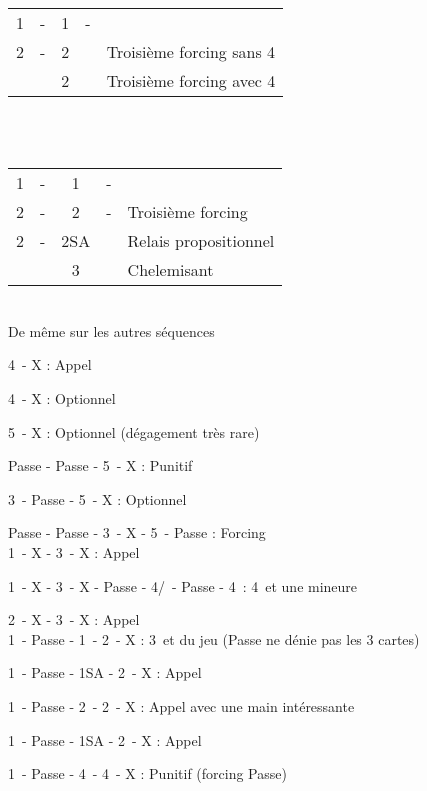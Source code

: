 \documentclass[a4paper, oneside, 11pt]{report}
\begin{document}
	\begin{tabular}{cccc|l}
	1\trefle & - & 1\pique & - &\\
	2\trefle & - & 2\carreau && Troisième forcing sans 4\coeur\\
	&& 2\coeur && Troisième forcing avec 4\coeur\\
	\end{tabular}\\\\
		
	\begin{tabular}{cccc|l}
	1\trefle & - & 1\coeur & - &\\
	2\trefle & - & 2\carreau & - & Troisième forcing\\
	2\coeur & - & 2SA && Relais propositionnel\\
	&& 3\coeur &&Chelemisant\\
	\end{tabular}\\
	De même sur les autres séquences
	
		4\coeur\ - X : Appel
		
		4\pique\ - X : Optionnel
		
		5\trefle\ - X : Optionnel (dégagement très rare)
		
		Passe - Passe - 5\trefle\ - X : Punitif
		
		3\trefle\ - Passe - 5\trefle\ - X : Optionnel
		
		Passe - Passe - 3\trefle\ - X - 5\trefle\ - Passe : Forcing\\
		
		1\pique\ - X - 3\pique\ - X : Appel
		
		1\pique\ - X - 3\pique\ - X - Passe - 4\trefle/\carreau\ - Passe - 4\coeur\ : 4\coeur\ et une mineure
		
		2\pique\ - X - 3\pique\ - X : Appel\\
		
		1\carreau\ - Passe - 1\coeur\ - 2\trefle\ - X : 3\coeur\ et du jeu (Passe ne dénie pas les 3 cartes)
		
		1\pique\ - Passe - 1SA - 2\trefle\ - X : Appel
		
		1\pique\ - Passe - 2\trefle\ - 2\coeur\ - X : Appel avec une main intéressante
		
		1\carreau\ - Passe - 1SA - 2\pique\ - X : Appel
		
		1\coeur\ - Passe - 4\coeur\ - 4\pique\ - X : Punitif (forcing Passe)\\
		
\end{document}
